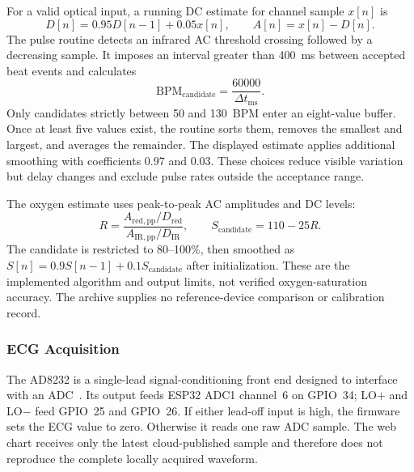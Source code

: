 For a valid optical input, a running DC estimate for channel sample $x[n]$ is
\begin{equation}
D[n]=0.95D[n-1]+0.05x[n],\qquad A[n]=x[n]-D[n].
\end{equation}
The pulse routine detects an infrared AC threshold crossing followed by a decreasing sample. It imposes an interval greater than 400~ms between accepted beat events and calculates
\begin{equation}
\mathrm{BPM}_{\mathrm{candidate}}=\frac{60000}{\Delta t_{\mathrm{ms}}}.
\end{equation}
Only candidates strictly between 50 and 130~BPM enter an eight-value buffer. Once at least five values exist, the routine sorts them, removes the smallest and largest, and averages the remainder. The displayed estimate applies additional smoothing with coefficients 0.97 and 0.03. These choices reduce visible variation but delay changes and exclude pulse rates outside the acceptance range.

The oxygen estimate uses peak-to-peak AC amplitudes and DC levels:
\begin{equation}
R=\frac{A_{\mathrm{red,pp}}/D_{\mathrm{red}}}{A_{\mathrm{IR,pp}}/D_{\mathrm{IR}}},\qquad
S_{\mathrm{candidate}}=110-25R.
\end{equation}
The candidate is restricted to 80--100\%, then smoothed as $S[n]=0.9S[n-1]+0.1S_{\mathrm{candidate}}$ after initialization. These are the implemented algorithm and output limits, not verified oxygen-saturation accuracy. The archive supplies no reference-device comparison or calibration record.

\subsubsection{ECG Acquisition}
The AD8232 is a single-lead signal-conditioning front end designed to interface with an ADC~\cite{ad8232}. Its output feeds ESP32 ADC1 channel~6 on GPIO~34; LO+ and LO$-$ feed GPIO~25 and GPIO~26. If either lead-off input is high, the firmware sets the ECG value to zero. Otherwise it reads one raw ADC sample. The web chart receives only the latest cloud-published sample and therefore does not reproduce the complete locally acquired waveform.

